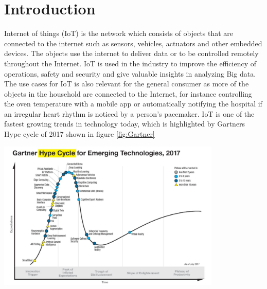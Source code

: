 \chapter{Introduction}



Internet of things (IoT) is the network which consists of objects that are connected to the internet such as sensors, vehicles, actuators and other embedded devices. The objects use the internet to deliver data or to be controlled remotely throughout the Internet. IoT is used in the industry to improve the efficiency of operations, safety and security and give valuable insights in analyzing Big data. The use cases for IoT is also relevant for the general consumer as more of the objects in the household are connected to the Internet, for instance controlling the oven temperature with a mobile app or automatically notifying the hospital if an irregular heart rhythm is noticed by a person's pacemaker. IoT is one of the fastest growing trends in technology today, which is highlighted by Gartners Hype cycle of 2017 shown in figure \ref{fig:Gartner}\\


\begin{minipage}[t]{0.8\textwidth}
    \centering
    \includegraphics[width=0.8\textwidth]{Images/Gartner.PNG}\\
    \label{fig:Gartner}
\end{minipage}
\\




